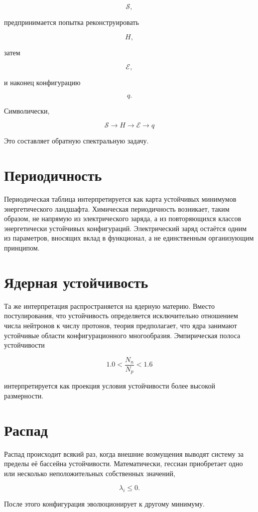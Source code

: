 \[ \mathcal S, \]

предпринимается попытка реконструировать

\[ H, \]

затем

\[ \mathcal E, \]

и наконец конфигурацию

\[ q. \]

Символически,

\[ \boxed{ \mathcal S \rightarrow H \rightarrow \mathcal E \rightarrow q } \]

Это составляет обратную спектральную задачу.

\section{Периодичность}

Периодическая таблица интерпретируется как карта устойчивых минимумов энергетического ландшафта. Химическая периодичность возникает, таким образом, не напрямую из электрического заряда, а из повторяющихся классов энергетически устойчивых конфигураций. Электрический заряд остаётся одним из параметров, вносящих вклад в функционал, а не единственным организующим принципом.

\section{Ядерная устойчивость}

Та же интерпретация распространяется на ядерную материю. Вместо постулирования, что устойчивость определяется исключительно отношением числа нейтронов к числу протонов, теория предполагает, что ядра занимают устойчивые области конфигурационного многообразия. Эмпирическая полоса устойчивости

\[ 1.0 < \frac{N_n}{N_p} < 1.6 \]

интерпретируется как проекция условия устойчивости более высокой размерности.

\section{Распад}

Распад происходит всякий раз, когда внешние возмущения выводят систему за пределы её бассейна устойчивости. Математически, гессиан приобретает одно или несколько неположительных собственных значений,

\[ \lambda_i \le 0. \]

После этого конфигурация эволюционирует к другому минимуму.

